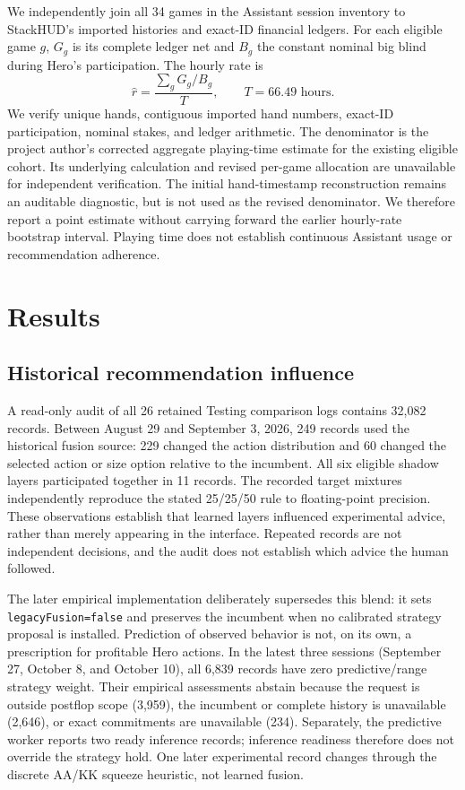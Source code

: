 \documentclass[11pt]{article}
\begin{document}
We independently join all 34 games in the Assistant session inventory to StackHUD's imported histories and exact-ID financial ledgers. For each eligible game \(g\), \(G_g\) is its complete ledger net and \(B_g\) the constant nominal big blind during Hero's participation. The hourly rate is
\begin{equation}
\widehat r=\frac{\sum_g G_g/B_g}{T},\qquad T=66.49\text{ hours}.
\end{equation}
We verify unique hands, contiguous imported hand numbers, exact-ID participation, nominal stakes, and ledger arithmetic. The denominator is the project author's corrected aggregate playing-time estimate for the existing eligible cohort. Its underlying calculation and revised per-game allocation are unavailable for independent verification. The initial hand-timestamp reconstruction remains an auditable diagnostic, but is not used as the revised denominator. We therefore report a point estimate without carrying forward the earlier hourly-rate bootstrap interval. Playing time does not establish continuous Assistant usage or recommendation adherence.

\section{Results}
\subsection{Historical recommendation influence}\label{sec:runtime-history}
A read-only audit of all 26 retained Testing comparison logs contains 32,082 records. Between August 29 and September 3, 2026, 249 records used the historical fusion source: 229 changed the action distribution and 60 changed the selected action or size option relative to the incumbent. All six eligible shadow layers participated together in 11 records. The recorded target mixtures independently reproduce the stated 25/25/50 rule to floating-point precision. These observations establish that learned layers influenced experimental advice, rather than merely appearing in the interface. Repeated records are not independent decisions, and the audit does not establish which advice the human followed.

The later empirical implementation deliberately supersedes this blend: it sets \texttt{legacyFusion=false} and preserves the incumbent when no calibrated strategy proposal is installed. Prediction of observed behavior is not, on its own, a prescription for profitable Hero actions. In the latest three sessions (September 27, October 8, and October 10), all 6,839 records have zero predictive/range strategy weight. Their empirical assessments abstain because the request is outside postflop scope (3,959), the incumbent or complete history is unavailable (2,646), or exact commitments are unavailable (234). Separately, the predictive worker reports two ready inference records; inference readiness therefore does not override the strategy hold. One later experimental record changes through the discrete AA/KK squeeze heuristic, not learned fusion.
\end{document}
